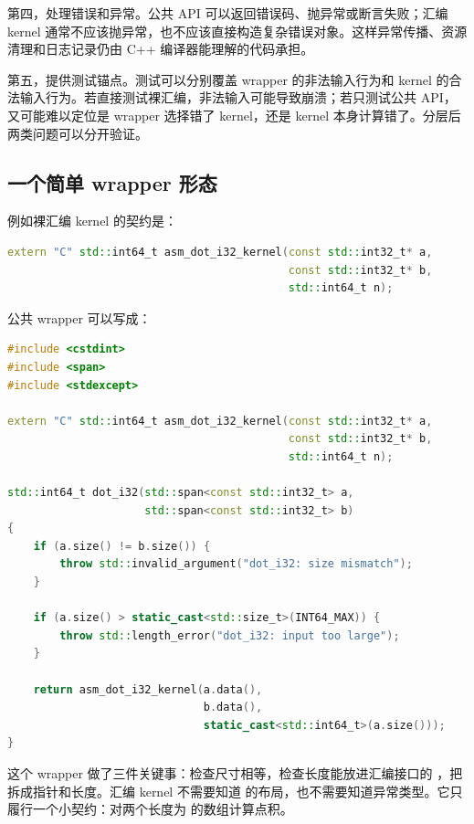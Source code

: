 第四，处理错误和异常。公共 API 可以返回错误码、抛异常或断言失败；汇编 kernel 通常不应该抛异常，也不应该直接构造复杂错误对象。这样异常传播、资源清理和日志记录仍由 C++ 编译器能理解的代码承担。

第五，提供测试锚点。测试可以分别覆盖 wrapper 的非法输入行为和 kernel 的合法输入行为。若直接测试裸汇编，非法输入可能导致崩溃；若只测试公共 API，又可能难以定位是 wrapper 选择错了 kernel，还是 kernel 本身计算错了。分层后两类问题可以分开验证。

\subsection{一个简单 wrapper 形态}

例如裸汇编 kernel 的契约是：

\begin{lstlisting}[language=C++]
extern "C" std::int64_t asm_dot_i32_kernel(const std::int32_t* a,
                                           const std::int32_t* b,
                                           std::int64_t n);
\end{lstlisting}

公共 wrapper 可以写成：

\begin{lstlisting}[language=C++]
#include <cstdint>
#include <span>
#include <stdexcept>

extern "C" std::int64_t asm_dot_i32_kernel(const std::int32_t* a,
                                           const std::int32_t* b,
                                           std::int64_t n);

std::int64_t dot_i32(std::span<const std::int32_t> a,
                     std::span<const std::int32_t> b)
{
    if (a.size() != b.size()) {
        throw std::invalid_argument("dot_i32: size mismatch");
    }

    if (a.size() > static_cast<std::size_t>(INT64_MAX)) {
        throw std::length_error("dot_i32: input too large");
    }

    return asm_dot_i32_kernel(a.data(),
                              b.data(),
                              static_cast<std::int64_t>(a.size()));
}
\end{lstlisting}

这个 wrapper 做了三件关键事：检查尺寸相等，检查长度能放进汇编接口的 ，把  拆成指针和长度。汇编 kernel 不需要知道  的布局，也不需要知道异常类型。它只履行一个小契约：对两个长度为  的数组计算点积。

